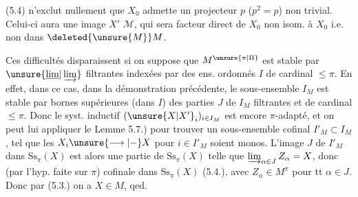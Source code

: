 
(5.4) n'exclut nullement que $X_0$ admette un projecteur $p$ ($p^2=p$) non trivial. Celui-ci aura une image $X'$  $\mathcal M$, qui sera facteur direct de $X_0$ non isom. à $X_0$ i.e. non dans $\deleted{\unsure{M}}M$.

Ces difficultés disparaissent si on suppose que $M^{\unsure{\pi|\Pi}}$ est stable par $\unsure{\underline{\lim}|\varinjlim}$ filtrantes indexées par des ens.  ordonnés $I$ de cardinal $\leq\pi$. En effet, dans ce cas,  dans la démonstration précédente, le sous-ensemble $I_M$ est stable par bornes supérieures (dans $I$) des parties $J$ de $I_M$ filtrantes et de cardinal $\leq\pi$. Donc le syst. inductif $(\unsure{X|X'}_i)_{i\in I_M}$ est encore $\pi$-adapté, et on peut lui appliquer le Lemme 5.7.) pour trouver un sous-ensemble cofinal $I'_M\subset I_M$, tel que les $X_i\unsure{\longrightarrow|-} X$ pour $i\in I'_M$ soient monos. L'image $J$ de $I'_M$ dans $\mathrm{Ss}_{\pi}(X)$ est alors une partie de $\mathrm{Ss}_{\pi}(X)$ telle que $\varinjlim_{\alpha\in J} Z_\alpha=X$, donc (par l'hyp. faite sur $\pi$) cofinale dans $\mathrm{Ss}_{\pi}(X)$ (5.4.), avec $Z_\alpha\in M^\pi$  pour tt $\alpha\in J$. Donc par (5.3.) on a $X\in M$, qed.

